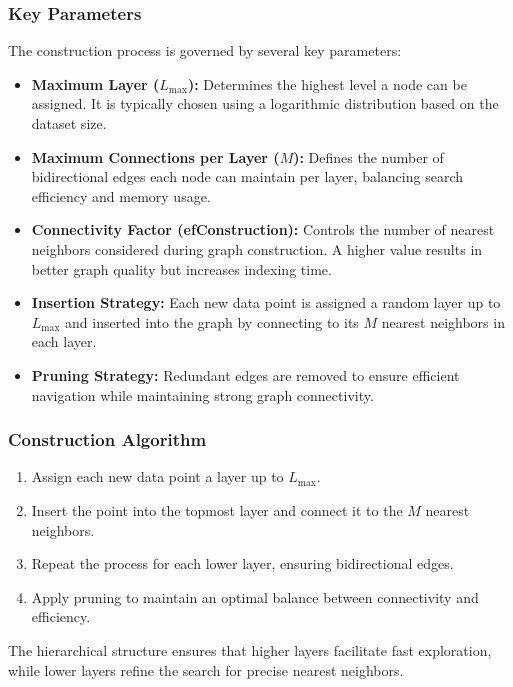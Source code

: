 \subsubsection*{Key Parameters}
The construction process is governed by several key parameters:
\begin{itemize}
    \item \textbf{Maximum Layer ($L_{\max}$):}  
    Determines the highest level a node can be assigned. It is typically chosen using a logarithmic distribution based on the dataset size.

    \item \textbf{Maximum Connections per Layer ($M$):}  
    Defines the number of bidirectional edges each node can maintain per layer, balancing search efficiency and memory usage.

    \item \textbf{Connectivity Factor (efConstruction):}  
    Controls the number of nearest neighbors considered during graph construction. A higher value results in better graph quality but increases indexing time.

    \item \textbf{Insertion Strategy:}  
    Each new data point is assigned a random layer up to $L_{\max}$ and inserted into the graph by connecting to its $M$ nearest neighbors in each layer.

    \item \textbf{Pruning Strategy:}  
    Redundant edges are removed to ensure efficient navigation while maintaining strong graph connectivity.
\end{itemize}

\subsubsection*{Construction Algorithm}

\begin{enumerate}
    \item Assign each new data point a layer up to $L_{\max}$.
    \item Insert the point into the topmost layer and connect it to the $M$ nearest neighbors.
    \item Repeat the process for each lower layer, ensuring bidirectional edges.
    \item Apply pruning to maintain an optimal balance between connectivity and efficiency.
\end{enumerate}

The hierarchical structure ensures that higher layers facilitate fast exploration, while lower layers refine the search for precise nearest neighbors.


